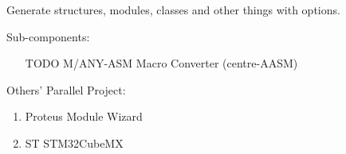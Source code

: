 
Generate structures, modules, classes and other things with options.

Sub-components: \begin{enumerate}
	\item [TODO] M/ANY-ASM Macro Converter (centre-AASM)
\end{enumerate}

Others' Parallel Project: \begin{enumerate}
	\item Proteus Module Wizard
	\item ST STM32CubeMX
\end{enumerate}
